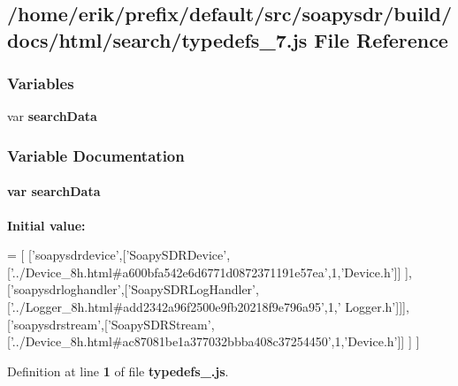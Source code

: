 \subsection{/home/erik/prefix/default/src/soapysdr/build/docs/html/search/typedefs\+\_\+7.js File Reference}
\label{typedefs__7_8js}
\subsubsection*{Variables}
\begin{DoxyCompactItemize}
\item 
var {\bf search\+Data}
\end{DoxyCompactItemize}


\subsubsection{Variable Documentation}
\paragraph[{search\+Data}]{\setlength{\rightskip}{0pt plus 5cm}var search\+Data}\label{typedefs__7_8js_ad01a7523f103d6242ef9b0451861231e}
{\bfseries Initial value\+:}
\begin{DoxyCode}
=
[
  [\textcolor{stringliteral}{'soapysdrdevice'},[\textcolor{stringliteral}{'SoapySDRDevice'},[\textcolor{stringliteral}{'../Device\_8h.html#a600bfa542e6d6771d0872371191e57ea'},1,\textcolor{stringliteral}{'Device.h'}]]
      ],
  [\textcolor{stringliteral}{'soapysdrloghandler'},[\textcolor{stringliteral}{'SoapySDRLogHandler'},[\textcolor{stringliteral}{'../Logger\_8h.html#add2342a96f2500e9fb20218f9e796a95'},1,\textcolor{stringliteral}{'
      Logger.h'}]]],
  [\textcolor{stringliteral}{'soapysdrstream'},[\textcolor{stringliteral}{'SoapySDRStream'},[\textcolor{stringliteral}{'../Device\_8h.html#ac87081be1a377032bbba408c37254450'},1,\textcolor{stringliteral}{'Device.h'}]]
      ]
]
\end{DoxyCode}


Definition at line {\bf 1} of file {\bf typedefs\+\_.\+js}.

